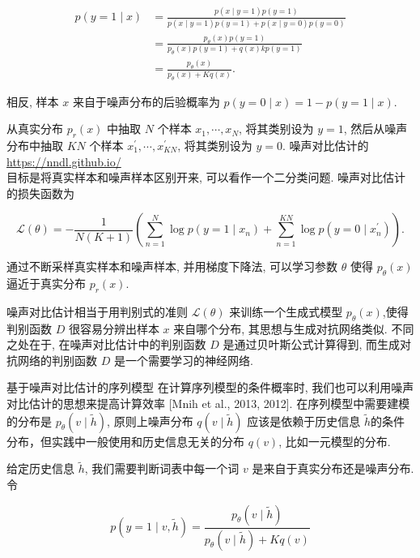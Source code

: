 \documentclass[10pt]{article}
\begin{document}
\begin{align*}
p(y=1 \mid x) & =\frac{p(x \mid y=1) p(y=1)}{p(x \mid y=1) p(y=1)+p(x \mid y=0) p(y=0)}  \tag{15.84}\\
& =\frac{p_{\theta}(x) p(y=1)}{p_{\theta}(x) p(y=1)+q(x) k p(y=1)}  \tag{15.85}\\
& =\frac{p_{\theta}(x)}{p_{\theta}(x)+K q(x)} . \tag{15.86}
\end{align*}


相反, 样本 $x$ 来自于噪声分布的后验概率为 $p(y=0 \mid x)=1-p(y=1 \mid x)$.

从真实分布 $p_{r}(x)$ 中抽取 $N$ 个样本 $x_{1}, \cdots, x_{N}$, 将其类别设为 $y=1$, 然后从噪声分布中抽取 $K N$ 个样本 $x_{1}^{\prime}, \cdots, x_{K N}^{\prime}$, 将其类别设为 $y=0$. 噪声对比估计的 \href{https://nndl.github.io/}{https://nndl.github.io/}\\
目标是将真实样本和噪声样本区别开来, 可以看作一个二分类问题. 噪声对比估计的损失函数为


\begin{equation*}
\mathcal{L}(\theta)=-\frac{1}{N(K+1)}\left(\sum_{n=1}^{N} \log p\left(y=1 \mid x_{n}\right)+\sum_{n=1}^{K N} \log p\left(y=0 \mid x_{n}^{\prime}\right)\right) . \tag{15.87}
\end{equation*}


通过不断采样真实样本和噪声样本, 并用梯度下降法, 可以学习参数 $\theta$ 使得 $p_{\theta}(x)$ 逼近于真实分布 $p_{r}(x)$.

噪声对比估计相当于用判别式的准则 $\mathcal{L}(\theta)$ 来训练一个生成式模型 $p_{\theta}(x)$,使得判别函数 $D$ 很容易分辨出样本 $x$ 来自哪个分布, 其思想与生成对抗网络类似. 不同之处在于, 在噪声对比估计中的判别函数 $D$ 是通过贝叶斯公式计算得到, 而生成对抗网络的判别函数 $D$ 是一个需要学习的神经网络.

基于噪声对比估计的序列模型 在计算序列模型的条件概率时, 我们也可以利用噪声对比估计的思想来提高计算效率 [Mnih et al., 2013, 2012]. 在序列模型中需要建模的分布是 $p_{\theta}(v \mid \tilde{h})$, 原则上噪声分布 $q(v \mid \tilde{h})$ 应该是依赖于历史信息 $\tilde{h}$的条件分布，但实践中一般使用和历史信息无关的分布 $q(v)$, 比如一元模型的分布.

给定历史信息 $\tilde{h}$, 我们需要判断词表中每一个词 $v$ 是来自于真实分布还是噪声分布. 令


\begin{equation*}
p(y=1 \mid v, \tilde{h})=\frac{p_{\theta}(v \mid \tilde{h})}{p_{\theta}(v \mid \tilde{h})+K q(v)} \tag{15.88}
\end{equation*}
\end{document}
